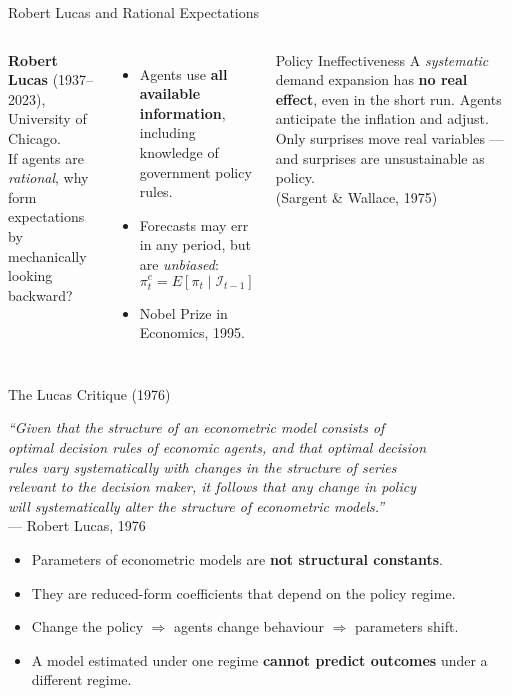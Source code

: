 \documentclass[aspectratio=169, 10pt]{beamer}
\begin{document}
\begin{frame}{Robert Lucas and Rational Expectations}
\begin{columns}[T]
\textbf{Robert Lucas} (1937--2023), University of Chicago.\\[6pt]
If agents are \textit{rational}, why form expectations by mechanically
looking backward?
\vspace{0.5em}
\begin{itemize}
  \item Agents use \textbf{all available information}, including knowledge
        of government policy rules.
  \item Forecasts may err in any period, but are \textit{unbiased}:
  \[
    \pi^e_t = E[\pi_t \mid \mathcal{I}_{t-1}]
  \]
  \item Nobel Prize in Economics, 1995.
\end{itemize}
\begin{block}{Policy Ineffectiveness}
A \textit{systematic} demand expansion has \textbf{no real effect},
even in the short run. Agents anticipate the inflation and adjust.
Only \alert{surprises} move real variables --- and surprises are
unsustainable as policy.\\[4pt]
(Sargent \& Wallace, 1975)
\end{block}
\end{columns}
\end{frame}

\begin{frame}{The Lucas Critique (1976)}
\begin{center}
\textit{``Given that the structure of an econometric model consists of\\
optimal decision rules of economic agents, and that optimal decision\\
rules vary systematically with changes in the structure of series\\
relevant to the decision maker, it follows that any change in policy\\
will systematically alter the structure of econometric models.''}\\[4pt]
--- Robert Lucas, 1976
\end{center}
\vspace{0.5em}
\begin{itemize}
  \item Parameters of econometric models are \textbf{not structural constants}.
  \item They are reduced-form coefficients that depend on the \alert{policy regime}.
  \item Change the policy $\Rightarrow$ agents change behaviour
        $\Rightarrow$ parameters shift.
  \item A model estimated under one regime \textbf{cannot predict outcomes}
        under a different regime.
\end{itemize}
\end{frame}
\end{document}
